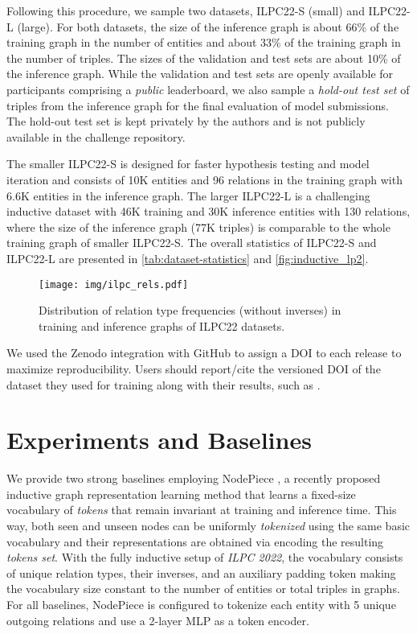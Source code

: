 \documentclass[sigconf,screen]{acmart}
\newcommand{\ilpc}{\textsl{\textsc{ILPC 2022}}\xspace}
\begin{document}
Following this procedure, we sample two datasets, ILPC22-S (small) and ILPC22-L (large). 
For both datasets, the size of the inference graph is about 66\% of the training graph in the number of entities and about 33\% of the training graph in the number of triples.
The sizes of the validation and test sets are about 10\% of the inference graph. 
While the validation and test sets are openly available for participants comprising a \emph{public} leaderboard, we also sample a \emph{hold-out test set} of triples from the inference graph  for the final evaluation of model submissions. 
The hold-out test set is kept privately by the authors and is not publicly available in the challenge repository.

The smaller ILPC22-S is designed for faster hypothesis testing and model iteration and consists of 10K entities and 96 relations in the training graph with 6.6K entities in the inference graph.
The larger ILPC22-L is a challenging inductive dataset with 46K training and 30K inference entities with 130 relations, where the size of the inference graph (77K triples) is comparable to the whole training graph of smaller ILPC22-S. 
The overall statistics of ILPC22-S and ILPC22-L are presented in \autoref{tab:dataset-statistics} and \autoref{fig:inductive_lp2}.

\begin{figure}[!h]
    \centering
    \texttt{[image: img/ilpc\_rels.pdf]}
    \caption{Distribution of relation type frequencies (without inverses) in training and inference graphs of ILPC22 datasets.}
    \label{fig:inductive_lp2}
\end{figure}

We used the Zenodo integration with GitHub to assign a DOI to each release to maximize reproducibility. Users should report/cite the versioned DOI of the dataset they used for training along with their results, such as \cite{ilpc2022github}.

\section{Experiments and Baselines}
\label{sec:experiments}

We provide two strong baselines employing NodePiece \cite{galkin2022nodepiece}, a recently proposed inductive graph representation learning method that learns a fixed-size vocabulary of \emph{tokens} that remain invariant at training and inference time. 
This way, both seen and unseen nodes can be uniformly \emph{tokenized} using the same basic vocabulary and their representations are obtained via encoding the resulting \emph{tokens set}. 
With the fully inductive setup of \ilpc, the vocabulary consists of unique relation types, their inverses, and an auxiliary padding token making the vocabulary size  constant to the number of entities or total triples in graphs. 
For all baselines, NodePiece is configured to tokenize each entity with 5 unique outgoing relations and use a 2-layer MLP as a token encoder.
\end{document}
